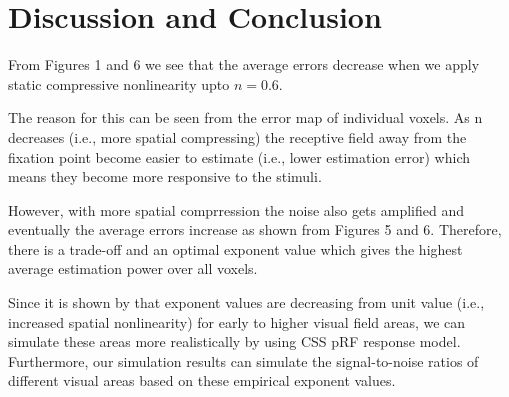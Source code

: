 \documentclass[]{article}
\begin{document}
\section{Discussion and Conclusion}
From Figures 1 and 6 we see that the average errors decrease when we apply static compressive nonlinearity upto $n=0.6$.

The reason for this can be seen from the error map of individual voxels. As n decreases (i.e., more spatial compressing) the receptive field away from the fixation point become easier to estimate (i.e., lower estimation error) which means they become more responsive to the stimuli.

However, with more spatial comprression the noise also gets amplified and eventually the average errors increase as shown from Figures 5 and 6. Therefore, there is a trade-off and an optimal exponent value which gives the highest average estimation power over all voxels.

Since it is shown by  that exponent values are decreasing from unit value (i.e., increased spatial nonlinearity) for early to higher visual field areas, we can simulate these areas more realistically by using CSS pRF response model. Furthermore, our simulation results can simulate the signal-to-noise ratios of different visual areas based on these empirical exponent values.


\end{document}
